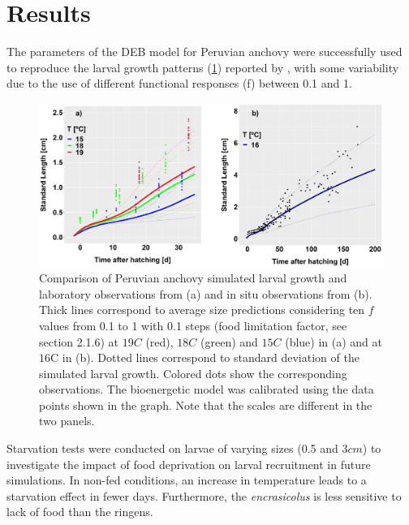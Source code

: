 \section{Results}

The parameters of the DEB model for Peruvian anchovy were successfully used to reproduce the larval growth patterns (\ref{Chap4DEBvsData}) reported by \citep{RiouOfel2021,OfelMoya2023}, with some variability due to the use of different functional responses (f) between 0.1 and 1.\\

\begin{figure}[H]
	\includegraphics[width=1.0\textwidth]{figures/Chap4DEBvsData.png}
	\centering
	\caption{Comparison of Peruvian anchovy simulated larval growth and laboratory observations from \cite{RiouOfel2021} (a) and in situ observations from \cite{MoreClar2011} (b). Thick lines correspond to average size predictions considering ten $f$ values from 0.1 to 1 with 0.1 steps (food limitation factor, see section 2.1.6) at $19$\textdegree $C$ (red), $18$\textdegree $C$ (green) and $15$\textdegree $C$ (blue) in (a) and at $16$\textdegree C in (b). Dotted lines correspond to standard deviation of the simulated larval growth. Colored dots show the corresponding observations. The bioenergetic model was calibrated using the data points shown in the graph. Note that the scales are different in the two panels.}
	\label{Chap4DEBvsData}
\end{figure}

Starvation tests were conducted on larvae of varying sizes (0.5 and $3 cm$) to investigate the impact of food deprivation on larval recruitment in future simulations. In non-fed conditions, an increase in temperature leads to a starvation effect in fewer days. Furthermore, the \textit{\gls{encrasicolus}} is less sensitive to lack of food than the \gls{ringens}.\\


